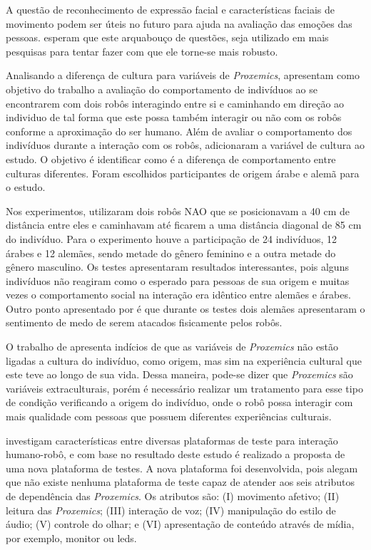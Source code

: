 A questão de reconhecimento de expressão facial e características faciais de movimento podem ser úteis no futuro para ajuda na avaliação das emoções das pessoas.  esperam que este arquabouço de questões, seja utilizado em mais pesquisas para tentar fazer com que ele torne-se mais robusto.

Analisando a diferença de cultura para variáveis de \emph{Proxemics},  apresentam como objetivo do trabalho a avaliação do comportamento de indivíduos ao se encontrarem com dois robôs interagindo entre si e caminhando em direção ao individuo de tal forma que este possa também interagir ou não com os robôs conforme a aproximação do ser humano. Além de avaliar o comportamento dos indivíduos durante a interação com os robôs,  adicionaram a variável de cultura ao estudo. O objetivo é identificar como é a diferença de comportamento entre culturas diferentes. Foram escolhidos participantes de origem árabe e alemã para o estudo.

Nos experimentos,  utilizaram dois robôs NAO que se posicionavam a 40 cm de distância entre eles e caminhavam até ficarem a uma distância diagonal de 85 cm do indivíduo. Para o experimento houve a participação de 24 indivíduos, 12 árabes e 12 alemães, sendo metade do gênero feminino e a outra metade do gênero masculino. Os testes apresentaram resultados interessantes, pois alguns indivíduos não reagiram como o esperado para pessoas de sua origem e muitas vezes o comportamento social na interação era idêntico entre alemães e árabes. Outro ponto apresentado por  é que durante os testes dois alemães apresentaram o sentimento de medo de serem atacados fisicamente pelos robôs.

O trabalho de  apresenta indícios de que as variáveis de \emph{Proxemics} não estão ligadas a cultura do indivíduo, como origem, mas sim na experiência cultural que este teve ao longo de sua vida. Dessa maneira, pode-se dizer que \emph{Proxemics} são variáveis extraculturais, porém é necessário realizar um tratamento para esse tipo de condição verificando a origem do indivíduo, onde o robô possa interagir com mais qualidade com pessoas que possuem diferentes experiências culturais.

 investigam características entre diversas plataformas de teste para interação humano-robô, e com base no resultado deste estudo é realizado a proposta de uma nova plataforma de testes. A nova plataforma foi desenvolvida, pois  alegam que não existe nenhuma plataforma de teste capaz de atender aos seis atributos de dependência das \emph{Proxemics}. Os atributos são: (I) movimento afetivo; (II) leitura das \emph{Proxemics}; (III) interação de voz; (IV) manipulação do estilo de áudio; (V) controle do olhar; e (VI) apresentação de conteúdo através de mídia, por exemplo, monitor ou leds.

